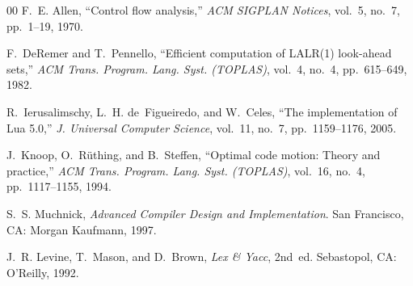 \documentclass[conference]{IEEEtran}
\begin{document}
\begin{thebibliography}{00}
F.~E. Allen,
``Control flow analysis,''
\textit{ACM SIGPLAN Notices}, vol.~5, no.~7, pp.~1--19, 1970.

F.~DeRemer and T.~Pennello,
``Efficient computation of LALR(1) look-ahead sets,''
\textit{ACM Trans. Program. Lang. Syst. (TOPLAS)}, vol.~4, no.~4, pp.~615--649, 1982.

R.~Ierusalimschy, L.~H. de~Figueiredo, and W.~Celes,
``The implementation of Lua 5.0,''
\textit{J. Universal Computer Science}, vol.~11, no.~7, pp.~1159--1176, 2005.

J.~Knoop, O.~R\"uthing, and B.~Steffen,
``Optimal code motion: Theory and practice,''
\textit{ACM Trans. Program. Lang. Syst. (TOPLAS)}, vol.~16, no.~4, pp.~1117--1155, 1994.

S.~S. Muchnick,
\textit{Advanced Compiler Design and Implementation}.
\newblock San Francisco, CA: Morgan Kaufmann, 1997.

J.~R. Levine, T.~Mason, and D.~Brown,
\textit{Lex \& Yacc}, 2nd~ed.
\newblock Sebastopol, CA: O'Reilly, 1992.

\end{thebibliography}
\end{document}
